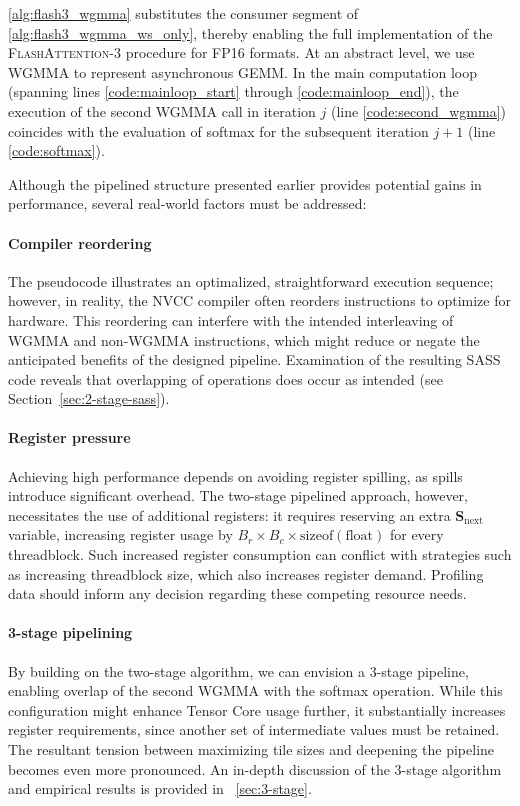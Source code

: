 \cref{alg:flash3_wgmma} substitutes the consumer segment of \cref{alg:flash3_wgmma_ws_only}, thereby enabling the full implementation of the \textsc{FlashAttention-3} procedure for FP16 formats. At an abstract level, we use WGMMA to represent asynchronous GEMM. In the main computation loop (spanning lines \ref{code:mainloop_start} through \ref{code:mainloop_end}), the execution of the second WGMMA call in iteration $j$ (line \ref{code:second_wgmma}) coincides with the evaluation of softmax for the subsequent iteration $j+1$ (line \ref{code:softmax}).

Although the pipelined structure presented earlier provides potential gains in performance, several real-world factors must be addressed:

\paragraph{Compiler reordering} The pseudocode illustrates an optimalized, straightforward execution sequence; however, in reality, the NVCC compiler often reorders instructions to optimize for hardware. This reordering can interfere with the intended interleaving of WGMMA and non-WGMMA instructions, which might reduce or negate the anticipated benefits of the designed pipeline. Examination of the resulting SASS code reveals that overlapping of operations does occur as intended (see Section~\ref{sec:2-stage-sass}).

\paragraph{Register pressure} Achieving high performance depends on avoiding register spilling, as spills introduce significant overhead. The two-stage pipelined approach, however, necessitates the use of additional registers: it requires reserving an extra $\mathbf{S}_{\mathrm{next}}$ variable, increasing register usage by $B_r \times B_c \times \text{sizeof}(\text{float})$ for every threadblock. Such increased register consumption can conflict with strategies such as increasing threadblock size, which also increases register demand. Profiling data should inform any decision regarding these competing resource needs.

\paragraph{3-stage pipelining} By building on the two-stage algorithm, we can envision a 3-stage pipeline, enabling overlap of the second WGMMA with the softmax operation. While this configuration might enhance Tensor Core usage further, it substantially increases register requirements, since another set of intermediate values must be retained. The resultant tension between maximizing tile sizes and deepening the pipeline becomes even more pronounced. An in-depth discussion of the 3-stage algorithm and empirical results is provided in ~\cref{sec:3-stage}.

